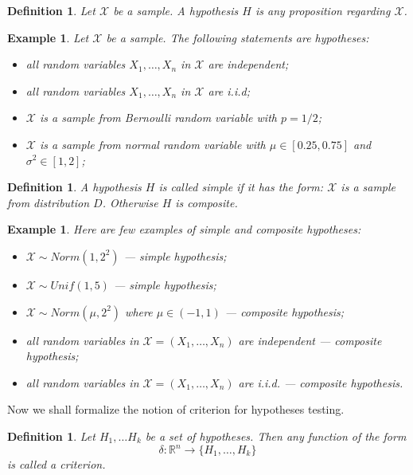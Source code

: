 \documentclass[12pt]{article}
\newtheorem{definition}[theorem]{Definition}
\newtheorem{example}[theorem]{Example}
\begin{document}
\begin{definition} Let $\mathscr{X}$ be a sample. A hypothesis $H$ is any
    proposition regarding $\mathscr{X}$.
\end{definition}

\begin{example} Let $\mathscr{X}$ be a sample. The following statements are
    hypotheses:
    \begin{itemize}
        \item all random variables $X_1,\ldots,X_n$ in $\mathscr{X}$ are
              independent;
        \item all random variables $X_1,\ldots,X_n$ in $\mathscr{X}$ are i.i.d;
        \item $\mathscr{X}$ is a sample from Bernoulli random variable with
              $p=1/2$;
        \item $\mathscr{X}$ is a sample from normal random variable with
              $\mu\in[0.25,0.75]$ and $\sigma^2\in[1,2]$;
    \end{itemize}
\end{example}

\begin{definition} A hypothesis $H$ is called simple if it has the form:
    $\mathscr{X}$ is a sample from distribution $D$. Otherwise $H$ is
    composite.
\end{definition}

\begin{example} Here are few examples of simple and composite hypotheses:
    \begin{itemize}
        \item $\mathscr{X}\sim Norm(1, 2^2)$ --- simple hypothesis;
        \item $\mathscr{X}\sim Unif(1, 5)$ --- simple hypothesis;
        \item $\mathscr{X}\sim Norm(\mu, 2^2)$ where $\mu\in(-1,1)$ ---
              composite hypothesis;
        \item all random variables in $\mathscr{X}=(X_1,\ldots,X_n)$ are
              independent --- composite hypothesis;
        \item all random variables in $\mathscr{X}=(X_1,\ldots,X_n)$ are i.i.d.
              --- composite hypothesis.
    \end{itemize}
\end{example}

Now we shall formalize the notion of criterion for hypotheses testing.

\begin{definition} Let $H_1,\ldots H_k$ be a set of hypotheses. Then any
    function of the form
    $$
        \delta:\mathbb{R}^n\to \{H_1,\ldots, H_k\}
    $$
    is called a criterion.
\end{definition}
\end{document}

